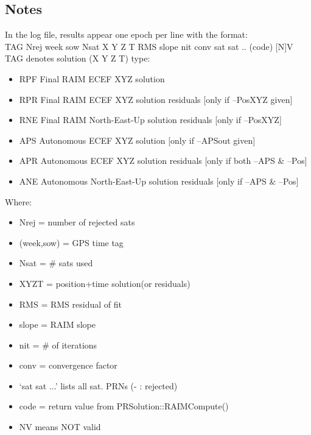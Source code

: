 \subsection{Notes}
 In the log file, results appear one epoch per line with the format:\\
 TAG Nrej week sow Nsat X Y Z T RMS slope nit conv sat sat .. (code) [N]V\\
 TAG denotes solution (X Y Z T) type:\\
\begin{itemize}
\item  RPF  Final RAIM ECEF XYZ solution
\item RPR  Final RAIM ECEF XYZ solution residuals [only if --PosXYZ given]
\item RNE  Final RAIM North-East-Up solution residuals [only if --PosXYZ]
\item  APS  Autonomous ECEF XYZ solution [only if --APSout given]
\item APR  Autonomous ECEF XYZ solution residuals [only if both --APS & --Pos] 
\item ANE  Autonomous North-East-Up solution residuals [only if --APS & --Pos]
\end{itemize}
Where:\\
\begin{itemize}
\item Nrej = number of rejected sats
\item (week,sow) = GPS time tag
\item Nsat = # sats used
\item XYZT = position+time solution(or residuals)
\item RMS = RMS residual of fit
\item slope = RAIM slope
\item nit = # of iterations
\item conv = convergence factor
\item `sat sat ...' lists all sat. PRNs (- : rejected)
\item code = return value from PRSolution::RAIMCompute()
\item NV means NOT valid
\end{itemize}
%

